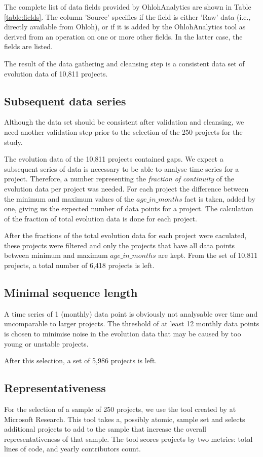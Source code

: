 The complete list of data fields provided by OhlohAnalytics are shown in Table
\ref{table:fields}. The column 'Source' specifies if the field is either 'Raw'
data (i.e., directly available from Ohloh), or if it is added by the
OhlohAnalytics tool as derived from an operation on one or more other fields.
In the latter case, the fields are listed.

The result of the data gathering and cleansing step is a consistent data set of
evolution data of 10,811 projects.



\subsection{Subsequent data series}
Although the data set should be consistent after validation and cleansing, we 
need another validation step prior to the selection of the 250 projects for the
study.

The evolution data of the 10,811 projects contained gaps. We expect a
subsequent series of data is necessary to be able to analyse time series for a
project. Therefore, a number representing the \emph{fraction of continuity }\rm
of the evolution data per project was needed. For each project the difference
between the minimum and maximum values of the $age\_in\_months$ fact is taken,
added by one, giving us the expected number of data points for a project. The
calculation of the fraction of total evolution data is done for each project.

After the fractions of the total evolution data for each project were caculated,
these projects were filtered and only the projects that have all data points
between minimum and maximum $age\_in\_months$ are kept. From the set of 10,811
projects, a total number of 6,418 projects is left.

\subsection{Minimal sequence length}
A time series of 1 (monthly) data point is obviously not analysable over time
and uncomparable to larger projects. The threshold of at least 12 monthly data
points is chosen to minimise noise in the evolution data that may be caused by
too young or unstable projects.

After this selection, a set of 5,986 projects is left.

\subsection{Representativeness}
For the selection of a sample of 250 projects, we use the tool created by
\citet{nagappan} at Microsoft Research. This tool takes a, possibly atomic,
sample set and selects additional projects to add to the sample that increase
the overall representativeness of that sample. The tool scores projects by two
metrics: total lines of code, and yearly contributors count.

